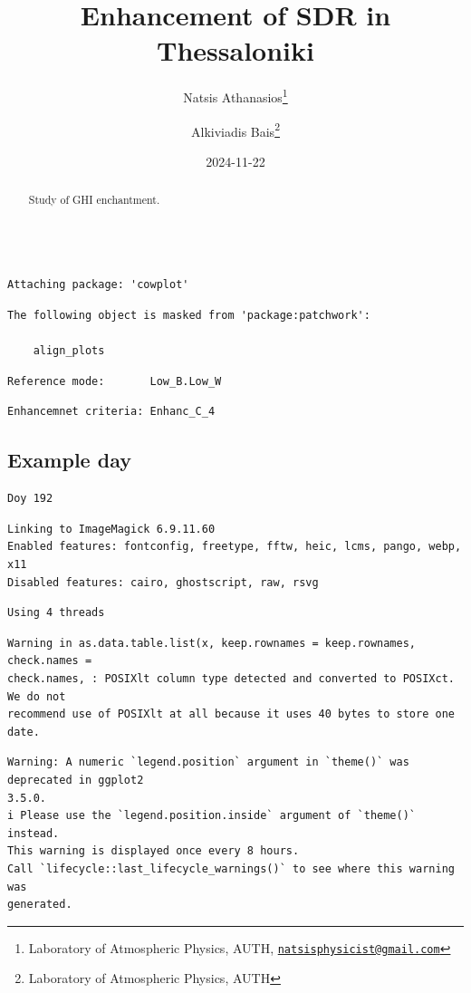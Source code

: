 \documentclass[
  10pt,
  a4paper,oneside]{article}
\title{Enhancement of SDR in Thessaloniki}
\author{Natsis Athanasios\footnote{Laboratory of Atmospheric Physics, AUTH, \href{mailto:natsisphysicist@gmail.com}{\nolinkurl{natsisphysicist@gmail.com}}} \and Alkiviadis Bais\footnote{Laboratory of Atmospheric Physics, AUTH}}
\date{2024-11-22}
\begin{document}
\maketitle
\begin{abstract}
Study of GHI enchantment.
\end{abstract}

{
\hypersetup{linkcolor=}
\setcounter{tocdepth}{4}
\tableofcontents
}
\begin{verbatim}

Attaching package: 'cowplot'
\end{verbatim}

\begin{verbatim}
The following object is masked from 'package:patchwork':

    align_plots
\end{verbatim}

\begin{verbatim}
Reference mode:       Low_B.Low_W 
\end{verbatim}

\begin{verbatim}
Enhancemnet criteria: Enhanc_C_4 
\end{verbatim}

\subsection{Example day}\label{example-day}

\begin{verbatim}
Doy 192 
\end{verbatim}

\begin{verbatim}
Linking to ImageMagick 6.9.11.60
Enabled features: fontconfig, freetype, fftw, heic, lcms, pango, webp, x11
Disabled features: cairo, ghostscript, raw, rsvg
\end{verbatim}

\begin{verbatim}
Using 4 threads
\end{verbatim}

\begin{verbatim}
Warning in as.data.table.list(x, keep.rownames = keep.rownames, check.names =
check.names, : POSIXlt column type detected and converted to POSIXct. We do not
recommend use of POSIXlt at all because it uses 40 bytes to store one date.
\end{verbatim}

\begin{verbatim}
Warning: A numeric `legend.position` argument in `theme()` was deprecated in ggplot2
3.5.0.
i Please use the `legend.position.inside` argument of `theme()` instead.
This warning is displayed once every 8 hours.
Call `lifecycle::last_lifecycle_warnings()` to see where this warning was
generated.
\end{verbatim}
\end{document}
